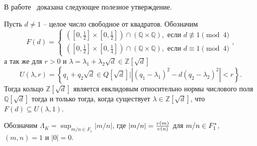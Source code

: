 \documentclass[_00_dissertation.tex]{subfiles}
\begin{document}
В работе~\cite{source:Selfridge} доказана следующее полезное утверждение.
\begin{proposition}\label{proposition:fundamental_in_circle}
    Пусть $d \neq 1$ -- целое число свободное от квадратов.
    Обозначим
    \begin{equation*}
        F(d) = \left\{\begin{split}
            \left(
                \left[0, \frac{1}{2}\right] \times \left[0, \frac{1}{2}\right]
            \right) \cap \left(
                \mathbb{Q} \times \mathbb{Q}
            \right), \textrm{ если } d \not\equiv 1 \pmod 4\\
            \left(
                \left[0, \frac{1}{2}\right] \times \left[0, \frac{1}{4}\right]
            \right) \cap \left(
                \mathbb{Q} \times \mathbb{Q}
            \right), \textrm{ если } d \equiv 1 \pmod 4
        \end{split}\right.,
    \end{equation*}
    а так же для $r > 0$ и $\lambda = \lambda_1 + \lambda_2 \sqrt{d} \in \mathbb{Z}[\sqrt{d}]$
    \begin{equation*}
        U(\lambda, r) = \left\{
            q_1 + q_2 \sqrt{d} \in Q[\sqrt{d}] \big| |(q_1 - \lambda_1)^2 - d(q_2 - \lambda_2)^2| < r
        \right\}.
    \end{equation*}
    Тогда кольцо $\mathbb{Z}[\sqrt{d}]$ является евклидовым относительно нормы числового поля $\mathbb{Q}[\sqrt{d}]$ тогда и только тогда, когда существует $\lambda \in \mathbb{Z}[\sqrt{d}]$, что $F(d) \subseteq U(\lambda, 1)$.
\end{proposition}

\begin{definition}
    Обозначим $\Lambda_K = \sup_{m/n \in F_1} |m/n|$, где $|m/n| = \frac{\upsilon(m)}{\upsilon(n)}$ для $m/n \in F_1^{*}$, $(m, n) = 1$ и $|0| = 0$.
\end{definition}
\end{document}
